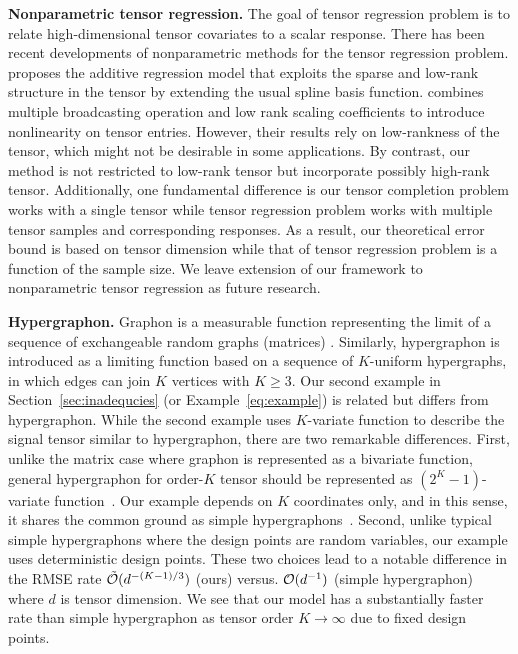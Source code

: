 \documentclass[twoside,11pt]{article}
\theoremstyle{plain}
\theoremstyle{definition}
\begin{document}
{\bf Nonparametric tensor regression.}
 The goal of tensor regression problem is to relate high-dimensional tensor covariates to a scalar response. There has been recent developments of nonparametric methods for the tensor regression problem.  \cite{hao2019sparse} proposes the additive regression model that exploits the sparse and low-rank structure in the tensor by extending the usual spline basis function. \cite{zhou2020broadcasted} combines multiple broadcasting operation and low rank scaling coefficients to introduce nonlinearity on tensor entries. However, their results rely on low-rankness of the tensor, which might not be desirable in some applications. By contrast, our method is not restricted to low-rank tensor but incorporate possibly high-rank tensor. Additionally, one fundamental difference is our tensor completion problem works with a single tensor while tensor regression problem works with multiple tensor samples and corresponding responses. As a result, our theoretical error bound is based on tensor dimension while that of  tensor regression problem  is a function of the sample size. We leave extension of our framework to nonparametric tensor regression as future research.

{\bf Hypergraphon.} Graphon is a measurable function representing the limit of a sequence of exchangeable random graphs (matrices) \citep{klopp2017oracle,gao2015rate,chan2014consistent}. Similarly, hypergraphon \citep{zhao2015hypergraph,lovasz2012large} is introduced as a limiting function based on a sequence of $K$-uniform hypergraphs, in which edges can join $K$ vertices with $K\geq 3.$ Our second example in Section~\ref{sec:inadequcies} (or  Example~\ref{eq:example}) is related but differs from hypergraphon. While the second example uses $K$-variate function to describe the signal tensor similar to hypergraphon, there are two remarkable differences. First, unlike the matrix case where graphon is represented as a bivariate function, general hypergraphon for order-$K$  tensor should be represented as $(2^K-1)$-variate function~\citep{zhao2015hypergraph}. Our example depends on
$K$ coordinates only, and in this sense, it shares the common ground as simple hypergraphons~\citep{balasubramanian2021nonparametric}. Second, unlike typical simple hypergraphons where the design points are random variables,  our example uses deterministic design points. These two choices lead to a notable difference in the RMSE rate $\tilde{\mathcal{O}}(d^{-(K-1)/3})$ (ours) versus. $\mathcal{O}(d^{-1})$ (simple hypergraphon)~\citep{balasubramanian2021nonparametric} where $d$ is tensor dimension. 
We see that our model has a substantially faster rate than simple hypergraphon as tensor order $K\rightarrow\infty$ due to fixed design points. 
\end{document}
